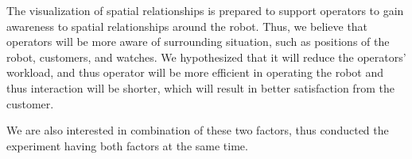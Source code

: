 \documentclass[journal]{IEEEtran}
\begin{document}
The visualization of spatial relationships is prepared to support operators to gain awareness to spatial relationships around the robot. 
Thus, we believe that operators will be more aware of surrounding situation, such as positions of the robot, customers, and watches. 
We hypothesized that it will reduce the operators' workload, and thus operator will be more efficient in operating the robot and thus interaction will be shorter, which will result in better satisfaction from the customer.

We are also interested in combination of these two factors, thus conducted the experiment having both factors at the same time.




\end{document}
